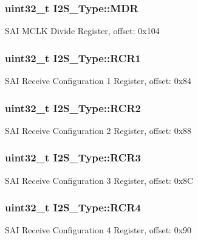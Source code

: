\subsubsection[{\texorpdfstring{M\+DR}{MDR}}]{ uint32\+\_\+t I2\+S\+\_\+\+Type\+::\+M\+DR}\hypertarget{structI2S__Type_aec34525af6f820dc003963ede5542ef1}{}\label{structI2S__Type_aec34525af6f820dc003963ede5542ef1}
S\+AI M\+C\+LK Divide Register, offset\+: 0x104 
\subsubsection[{\texorpdfstring{R\+C\+R1}{RCR1}}]{ uint32\+\_\+t I2\+S\+\_\+\+Type\+::\+R\+C\+R1}\hypertarget{structI2S__Type_a77ddbd77c8641790f011e95f040dc221}{}\label{structI2S__Type_a77ddbd77c8641790f011e95f040dc221}
S\+AI Receive Configuration 1 Register, offset\+: 0x84 
\subsubsection[{\texorpdfstring{R\+C\+R2}{RCR2}}]{ uint32\+\_\+t I2\+S\+\_\+\+Type\+::\+R\+C\+R2}\hypertarget{structI2S__Type_ac0bdbdf0882c75715cd446c6d677ace2}{}\label{structI2S__Type_ac0bdbdf0882c75715cd446c6d677ace2}
S\+AI Receive Configuration 2 Register, offset\+: 0x88 
\subsubsection[{\texorpdfstring{R\+C\+R3}{RCR3}}]{ uint32\+\_\+t I2\+S\+\_\+\+Type\+::\+R\+C\+R3}\hypertarget{structI2S__Type_a4d721096f492566c33c2354f7630624f}{}\label{structI2S__Type_a4d721096f492566c33c2354f7630624f}
S\+AI Receive Configuration 3 Register, offset\+: 0x8C 
\subsubsection[{\texorpdfstring{R\+C\+R4}{RCR4}}]{ uint32\+\_\+t I2\+S\+\_\+\+Type\+::\+R\+C\+R4}\hypertarget{structI2S__Type_a29f97512ded526be9f3672d7db6793ac}{}\label{structI2S__Type_a29f97512ded526be9f3672d7db6793ac}
S\+AI Receive Configuration 4 Register, offset\+: 0x90 
